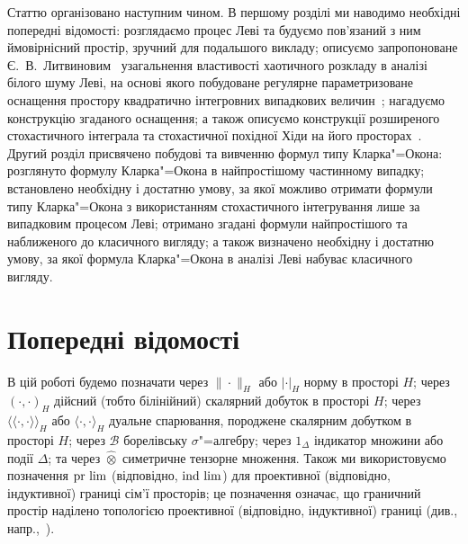 Статтю організовано наступним чином.
В першому розділі ми наводимо необхідні попередні відомості: розглядаємо процес Леві та будуємо пов'язаний з ним ймовірнісний простір, зручний для подальшого викладу; описуємо запропоноване Є.~В.~Литвиновим~\cite{L03} узагальнення властивості хаотичного розкладу в аналізі білого шуму Леві, на основі якого побудоване регулярне параметризоване оснащення простору квадратично інтегровних випадкових величин~\cite{K13_2}; нагадуємо конструкцію згаданого оснащення; а також описуємо конструкції розширеного стохастичного інтеграла та стохастичної похідної Хіди на його просторах~\cite{K13,K13_2}.
Другий розділ присвячено побудові та вивченню формул типу Кларка"=Окона: розглянуто формулу Кларка"=Окона в найпростішому частинному випадку; встановлено необхідну і достатню умову, за якої можливо отримати формули типу Кларка"=Окона з використанням стохастичного інтегрування лише за випадковим процесом Леві; отримано згадані формули найпростішого та наближеного до класичного вигляду; а також визначено необхідну і достатню умову, за якої формула Кларка"=Окона в аналізі Леві набуває класичного вигляду.


\section{Попередні відомості}
В цій роботі будемо позначати через $\|\cdot\|_H$ або $|\cdot|_H$ норму в просторі $H$; через $(\cdot,\cdot)_H$ дійсний (тобто білінійний) скалярний добуток в просторі $H$; через $\langle\!\langle\cdot,\cdot\rangle\!\rangle_H$ або $\langle\cdot,\cdot\rangle_H$ дуальне спарювання, породжене скалярним добутком в просторі $H$; через $\mathcal B$ борелівську $\sigma$"=алгебру; через $1_\Delta$ індикатор множини або події $\Delta$; та через $\widehat\otimes$ симетричне тензорне множення.
Також ми використовуємо позначення $\mathop{\rm{pr\ lim}}$ (відповідно, $\mathop{\rm{ind\ lim}}$) для проективної (відповідно, індуктивної) границі сім'ї просторів; це позначення означає, що граничний простір наділено топологією проективної (відповідно, індуктивної) границі (див., напр.,~\cite{BUS90}).

